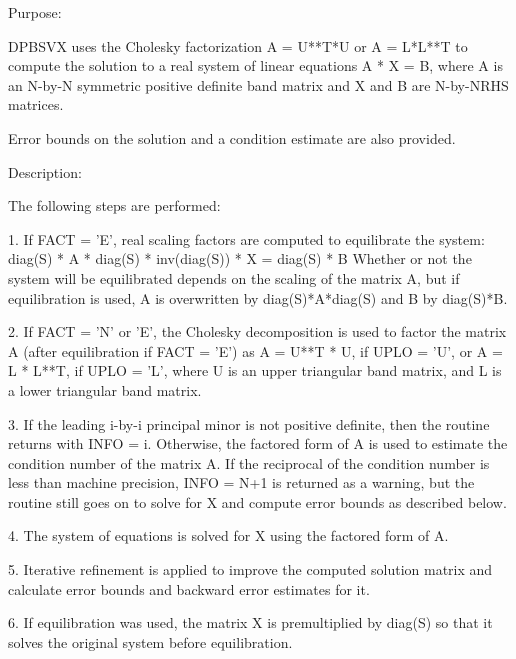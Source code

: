  \begin{DoxyParagraph}{Purpose\+: }
\begin{DoxyVerb} DPBSVX uses the Cholesky factorization A = U**T*U or A = L*L**T to
 compute the solution to a real system of linear equations
    A * X = B,
 where A is an N-by-N symmetric positive definite band matrix and X
 and B are N-by-NRHS matrices.

 Error bounds on the solution and a condition estimate are also
 provided.\end{DoxyVerb}
 
\end{DoxyParagraph}
\begin{DoxyParagraph}{Description\+: }
\begin{DoxyVerb} The following steps are performed:

 1. If FACT = 'E', real scaling factors are computed to equilibrate
    the system:
       diag(S) * A * diag(S) * inv(diag(S)) * X = diag(S) * B
    Whether or not the system will be equilibrated depends on the
    scaling of the matrix A, but if equilibration is used, A is
    overwritten by diag(S)*A*diag(S) and B by diag(S)*B.

 2. If FACT = 'N' or 'E', the Cholesky decomposition is used to
    factor the matrix A (after equilibration if FACT = 'E') as
       A = U**T * U,  if UPLO = 'U', or
       A = L * L**T,  if UPLO = 'L',
    where U is an upper triangular band matrix, and L is a lower
    triangular band matrix.

 3. If the leading i-by-i principal minor is not positive definite,
    then the routine returns with INFO = i. Otherwise, the factored
    form of A is used to estimate the condition number of the matrix
    A.  If the reciprocal of the condition number is less than machine
    precision, INFO = N+1 is returned as a warning, but the routine
    still goes on to solve for X and compute error bounds as
    described below.

 4. The system of equations is solved for X using the factored form
    of A.

 5. Iterative refinement is applied to improve the computed solution
    matrix and calculate error bounds and backward error estimates
    for it.

 6. If equilibration was used, the matrix X is premultiplied by
    diag(S) so that it solves the original system before
    equilibration.\end{DoxyVerb}
 
\end{DoxyParagraph}

